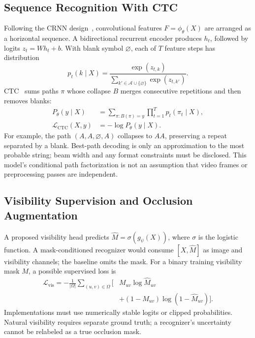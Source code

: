 \documentclass[journal]{IEEEtran}
\newcommand{\calA}{\mathcal{A}}
\begin{document}
\subsection{Sequence Recognition With CTC}
Following the CRNN design~\cite{shi2017}, convolutional features $F=\phi_\theta(X)$ are arranged as a horizontal sequence. A bidirectional recurrent encoder produces $h_t$, followed by logits $z_t=W h_t+b$. With blank symbol $\varnothing$, each of $T$ feature steps has distribution
\begin{equation}\label{eq:softmax}
 p_t(k\mid X)=\frac{\exp(z_{t,k})}
 {\sum_{k'\in\calA\cup\{\varnothing\}}\exp(z_{t,k'})}.
\end{equation}
CTC~\cite{graves2006} sums paths $\pi$ whose collapse $B$ merges consecutive repetitions and then removes blanks:
\begin{align}
 P_\theta(y\mid X)&=\sum_{\pi:B(\pi)=y}\prod_{t=1}^{T}p_t(\pi_t\mid X),\label{eq:ctc}\\
 \mathcal{L}_{\mathrm{CTC}}(X,y)&=-\log P_\theta(y\mid X).\label{eq:ctcloss}
\end{align}
For example, the path $(A,A,\varnothing,A)$ collapses to $AA$, preserving a repeat separated by a blank. Best-path decoding is only an approximation to the most probable string; beam width and any format constraints must be disclosed. This model's conditional path factorization is not an assumption that video frames or preprocessing passes are independent.

\subsection{Visibility Supervision and Occlusion Augmentation}
A proposed visibility head predicts $\widehat M=\sigma(g_\psi(X))$, where $\sigma$ is the logistic function. A mask-conditioned recognizer would consume $[X,\widehat M]$ as image and visibility channels; the baseline omits the mask. For a binary training visibility mask $M$, a possible supervised loss is
\begin{equation}\label{eq:maskloss}
\begin{split}
 \mathcal{L}_{\mathrm{vis}}=-\frac{1}{|\Omega|}\sum_{(u,v)\in\Omega}
 \big[&M_{uv}\log\widehat M_{uv}\\
 &+(1-M_{uv})\log(1-\widehat M_{uv})\big].
\end{split}
\end{equation}
Implementations must use numerically stable logits or clipped probabilities. Natural visibility requires separate ground truth; a recognizer's uncertainty cannot be relabeled as a true occlusion mask.
\end{document}
